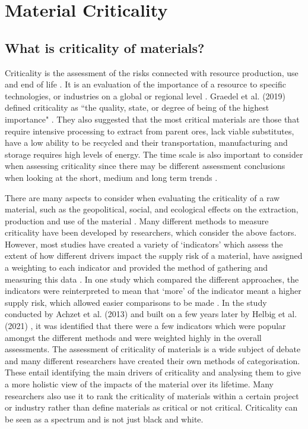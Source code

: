 \documentclass{article}
\begin{document}
\section{Material Criticality}

\subsection{What is criticality of materials?}

Criticality is the assessment of the risks connected with resource production, use and end of life \cite{graedel2014employing}. It is an evaluation of the importance of a resource to specific technologies, or industries on a global or regional level \cite{schrijvers2020review}. Graedel et al. (2019) defined criticality as ``the quality, state, or degree of being of the highest importance" \cite{graedel2019defining}. They also suggested that the most critical materials are those that require intensive processing to extract from parent ores, lack viable substitutes, have a low ability to be recycled and their transportation, manufacturing and storage requires high levels of energy. The time scale is also important to consider when assessing criticality since there may be different assessment conclusions when looking at the short, medium and long term trends \cite{riddle2015global}.

There are many aspects to consider when evaluating the criticality of a raw material, such as the geopolitical, social, and ecological effects on the extraction, production and use of the material \cite{kristof2010finalreport}. 
Many different methods to measure criticality have been developed by researchers, which consider the above factors. However, most studies have created a variety of `indicators' which assess the extent of how different drivers impact the supply risk of a material, have assigned a weighting to each indicator and provided the method of gathering and measuring this data \cite{achzet2013evaluate}. In one study which compared the different approaches, the indicators were reinterpreted to mean that `more' of the indicator meant a higher supply risk, which allowed easier comparisons to be made \cite{helbig2021overview}. In the study conducted by Achzet et al. (2013) \cite{achzet2013evaluate} and built on a few years later by Helbig et al. (2021) \cite{helbig2021overview}, it was identified that there were a few indicators which were popular amongst the different methods and were weighted highly in the overall assessments. The assessment of criticality of materials is a wide subject of debate and many different researchers have created their own methods of categorisation. These entail identifying the main drivers of criticality and analysing them to give a more holistic view of the impacts of the material over its lifetime. Many researchers also use it to rank the criticality of materials within a certain project or industry rather than define materials as critical or not critical. Criticality can be seen as a spectrum and is not just black and white. 
\end{document}
